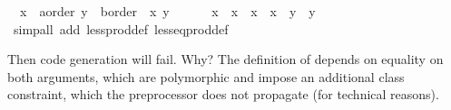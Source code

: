 \begin{isabellebody}
\ \ {\isachardoublequoteopen}{\isacharparenleft}x{}\ {\isasymColon}\ {\isacharprime}a{\isasymColon}order{\isacharcomma}\ y{}\ {\isasymColon}\ {\isacharprime}b{\isasymColon}order{\isacharparenright}\ {\isasymle}\ {\isacharparenleft}x{}{\isacharcomma}\ y{}{\isacharparenright}\ {\isasymlongleftrightarrow}\isanewline
\ \ \ \ \ x{}\ {\isacharless}\ x{}\ {\isasymor}\ x{}\ {\isacharequal}\ x{}\ {\isasymand}\ y{}\ {\isasymle}\ y{}{\isachardoublequoteclose}\isanewline
\ \ \isamarkupfalse%
\ {\isacharparenleft}simp{\isacharunderscore}all\ add{\isacharcolon}\ less{\isacharunderscore}prod{\isacharunderscore}def\ less{\isacharunderscore}eq{\isacharunderscore}prod{\isacharunderscore}def{\isacharparenright}%
\endisatagquote
{\isafoldquote}%
%
\isadelimquote
%
\endisadelimquote
%
\begin{isamarkuptext}%
\noindent Then code generation will fail.  Why?  The definition
  of  depends on equality on both arguments,
  which are polymorphic and impose an additional 
  class constraint, which the preprocessor does not propagate
  (for technical reasons).


\end{isamarkuptext}
\end{isabellebody}
